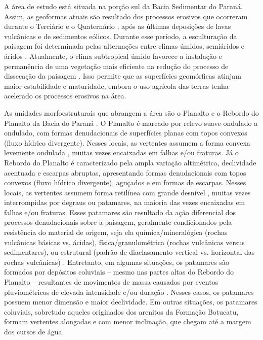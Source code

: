 A área de estudo está situada na porção sul da Bacia Sedimentar do Paraná. Assim, as geoformas atuais são 
resultado dos processos erosivos que ocorreram durante o Terciário e o Quaternário \cite{Sartori2009}, após as 
últimas deposições de lavas vulcânicas e de sedimentos eólicos. Durante esse período, a esculturação da 
paisagem foi determinada pelas alternações entre climas úmidos, semiáridos e áridos \cite{Sartori2009}. 
Atualmente, o clima subtropical úmido favorece a instalação e permanência de uma vegetação mais eficiente na 
redução do processo de dissecação da paisagem \cite{Sartori2009, NascimentoEtAl2010}. Isso permite que as 
superfícies geomórficas atinjam maior estabilidade e maturidade, embora o uso agrícola das terras tenha 
acelerado os processos erosivos na área.


As unidades morfoestruturais que abrangem a área são o Planalto e o Rebordo do Planalto da Bacia do Paraná 
\cite{NascimentoEtAl2010}. O Planalto é marcado por relevo suave-ondulado a ondulado, com formas denudacionais 
de superfícies planas com topos convexos (fluxo hídrico divergente). Nesses locais, as vertentes assumem a 
forma convexa levemente ondulada \cite{NascimentoEtAl2010}, muitas vezes encaixadas em falhas e/ou fraturas. 
Já o Rebordo do Planalto é caracterizado pela ampla variação altimétrica, declividade acentuada e escarpas 
abruptas, apresentando formas denudacionais com topos convexos (fluxo hídrico divergente), aguçados e em 
formas de escarpas. Nesses locais, as vertentes assumem forma retilínea com grande desnível 
\cite{NascimentoEtAl2010}, muitas vezes interrompidas por degraus ou patamares, na maioria das vezes 
encaixadas 
em falhas e/ou fraturas. Esses patamares são resultado da ação diferencial dos processos denudacionais sobre a 
paisagem, geralmente condicionados pela resistência do material de origem, seja ela química/mineralógica 
(rochas vulcânicas básicas vs. ácidas), física/granulométrica (rochas vulcânicas versus sedimentares), ou 
estrutural (padrão de diaclasamento vertical vs. horizontal das rochas vulcânicas) \cite{Holtz2003, 
Pedron2007, 
StreckEtAl2008}. Entretanto, em algumas situações, os patamares são formados por depósitos coluviais -- mesmo 
nas partes altas do Rebordo do Planalto -- resultantes de movimentos de massa causados por eventos 
pluviométricos de elevada intensidade e/ou duração \cite{PinheiroEtAl2004, PaisaniEtAl2010}. Nesses casos, os 
patamares possuem menor dimensão e maior declividade. Em outras situações, os patamares coluviais, sobretudo 
aqueles originados dos arenitos da Formação Botucatu, formam 
vertentes alongadas e com menor inclinação, que chegam até a margem dos cursos de água.

